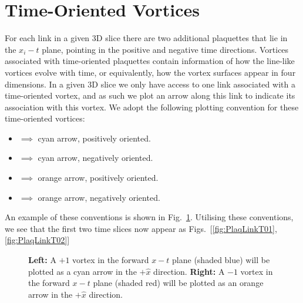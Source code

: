\section{Time-Oriented Vortices}
For each link in a given 3D slice there are two additional plaquettes that lie in the $x_i - t$ plane, pointing in the positive and negative time directions. Vortices associated with time-oriented plaquettes contain information of how the line-like vortices evolve with time, or equivalently, how the vortex surfaces appear in four dimensions. In a given 3D slice we only have access to one link associated with a time-oriented vortex, and as such we plot an arrow along this link to indicate its association with this vortex. We adopt the following plotting convention for these time-oriented vortices:
\begin{itemize}[leftmargin=*,itemsep=0pt,labelsep=12pt]
\item  {}  $\implies$ cyan arrow, positively oriented.
\item  {} $\implies$ cyan arrow, negatively oriented.
\item  {}  $\implies$ orange arrow, positively oriented.
\item  {} $\implies$ orange arrow, negatively oriented.
\end{itemize}
An example of these conventions is shown in Fig.~\ref{fig:TimeVortices}. Utilising these conventions, we see that the first two time slices now appear as Figs.~[\ref{fig:PlaqLinkT01}, \ref{fig:PlaqLinkT02}]\\
%
\begin{figure}[ht]
\centering
  \begin{subfigure}[b]{0.45\textwidth}
  \centering
  
  \end{subfigure}
  \hfill
  \begin{subfigure}[b]{0.45\textwidth}
  \centering
  
  \end{subfigure}             
  \caption{\textbf{Left:} A $+1$ vortex in the forward $x-t$ plane (shaded blue) will be plotted as a cyan arrow in the $+\hat{x}$ direction. \textbf{Right:} A $-1$ vortex in the forward $x-t$ plane (shaded red) will be plotted as an orange arrow in the $+\hat{x}$ direction.}
  \label{fig:TimeVortices}
\end{figure}
%
